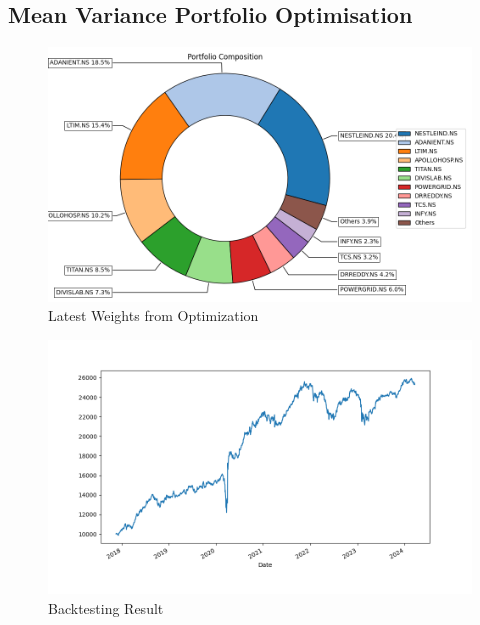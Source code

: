 \subsection{Mean Variance Portfolio Optimisation}

\begin{figure}[H]
   \centering
   \includegraphics[width=1\linewidth]{images/MV/Weights.png}
   \caption{Latest Weights from Optimization}
   \label{fig:network_architecture1}
 \end{figure}

 \begin{figure}[H]
   \centering
   \includegraphics[width=1\linewidth]{images/MV/backtest.png}
   \caption{Backtesting Result}
   \label{fig:network_architecture1}
 \end{figure}

